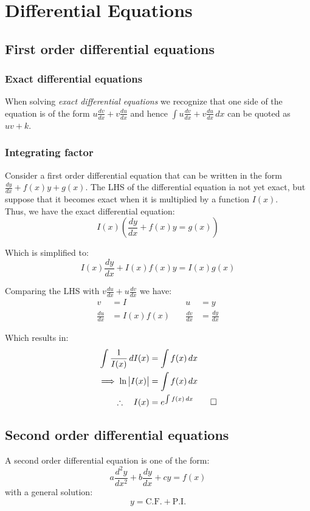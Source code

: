 \documentclass{standalone}
\begin{document}
	
	\chapter{Differential Equations}
	
	\section{First order differential equations}
	\subsection{Exact differential equations}
	When solving \textit{exact differential equations} we recognize that one side of the equation is of the form $u\frac{dv}{dx} + v\frac{du}{dx}$ and hence  $\int u\frac{dv}{dx} + v\frac{du}{dx}\,dx$ can be quoted as $uv+k$.
	
	\subsection{Integrating factor}
	Consider a first order differential equation that can be written in the form $\frac{dy}{dx} + f(x)y + g(x)$. The LHS of the differential equation ia not yet exact, but suppose that it becomes exact when it is multiplied by a function $I(x)$.\\
	
	Thus, we have the exact differential equation: \[I(x)\left(\frac{dy}{dx} + f(x)y =  g(x)\right)\]
	
	Which is simplified to: \[I(x)\frac{dy}{dx} + I(x)f(x)y = I(x)g(x)\]
	
	Comparing the LHS with $v\frac{du}{dx} + u\frac{dv}{dx}$ we have: 
	\begin{align*}  v&=I &\quad u&=y\\    \frac{du}{dx} &= I(x)f(x) &\quad \frac{dv}{dx} &= \frac{dy}{dx} \end{align*}
	
	Which results in: 
	\begin{align*}
		\int\frac{1}{I(x)}\,dI(x)      & = \int f(x)\,dx         \\
		\implies \ln\left| I(x)\right| & = \int f(x)\, dx        \\
		\therefore \quad	I(x)          & = e^{\int f(x)\,dx} \qed 
	\end{align*}
	
	\newpage
	\section{Second order differential equations}
	A second order differential equation is one of the form: \[a\frac{d^2y}{dx^2} + b\frac{dy}{dx} + cy= f(x)\] with a general solution: \[y=\text{C.F.} + \text{P.I.}\]
	
\end{document}
